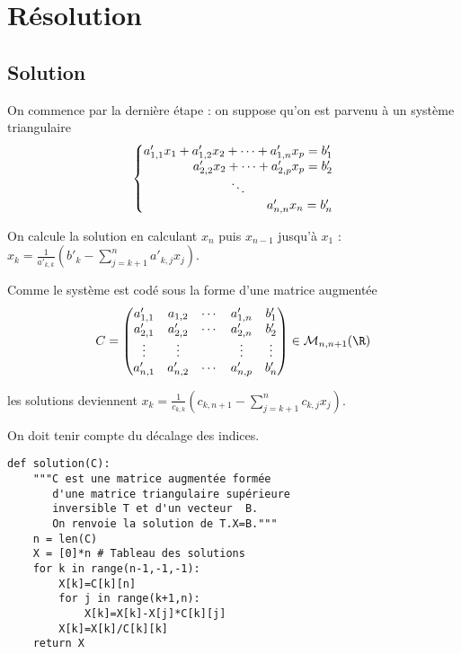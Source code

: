 \section{Résolution}
\subsection{Solution}
On commence par la dernière étape : on suppose qu'on est parvenu à un système triangulaire
\[\left\{
\begin{matrix}a'_{1,1}x_1+a'_{1,2}x_2+\cdots+a'_{1,n}x_p=b'_1\\
\hfill a'_{2,2}x_2+\cdots+a'_{2,p}x_p=b'_2\\
\ddots\\
\hfill a'_{n,n}x_n=b'_n\\
\end{matrix}\right. 
\]

On calcule la solution en calculant $x_n$ puis $x_{n-1}$ jusqu'à $x_1$ :
$\displaystyle x_k = \frac 1{a'_{k,k}}\left(b'_k - \sum_{j=k+1}^n a'_{k, j}x_j\right)$.


Comme le système est codé sous la forme d'une matrice augmentée
\[C=\begin{pmatrix}a'_{1,1}&a_{1,2}&\cdots&a'_{1,n}&b'_1\\
a'_{2,1}&a'_{2,2}&\cdots&a'_{2,n}&b'_2\\
\vdots&\vdots&&\vdots&\vdots\\
a'_{n,1}&a'_{n,2}&\cdots&a'_{n,p}&b'_n\\
\end{pmatrix}\in{\cal M}_{n,n+1}({\R})\]

les solutions deviennent $\displaystyle x_k = \frac 1{c_{k,k}}\left(c_{k, n+1} - \sum_{j=k+1}^n c_{k, j}x_j\right)$.

On doit tenir compte du décalage des indices.
\begin{lstlisting}
def solution(C):
    """C est une matrice augmentée formée 
       d'une matrice triangulaire supérieure 
       inversible T et d'un vecteur  B.
       On renvoie la solution de T.X=B."""
    n = len(C)
    X = [0]*n # Tableau des solutions
    for k in range(n-1,-1,-1): 
        X[k]=C[k][n]           
        for j in range(k+1,n):
            X[k]=X[k]-X[j]*C[k][j] 
        X[k]=X[k]/C[k][k]          
    return X
\end{lstlisting}

